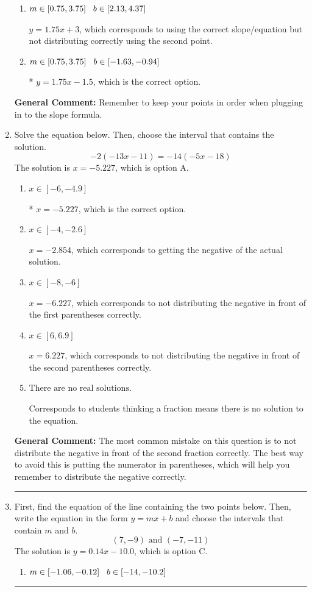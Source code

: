 \documentclass{extbook}[14pt]
\newcommand{\litem}[1]{\item #1

\rule{\textwidth}{0.4pt}}
\begin{document}
\begin{enumerate}
{\begin{enumerate}[label=\Alph*.]
 $y = -1.75x + 19.5$, which corresponds to using the negative slope and the correct equation.
\item \( m \in [0.75, 3.75] \hspace*{3mm} b \in [2.13, 4.37] \)

 $y = 1.75x + 3$, which corresponds to using the correct slope/equation but not distributing correctly using the second point.
\item \( m \in [0.75, 3.75] \hspace*{3mm} b \in [-1.63, -0.94] \)

* $y = 1.75x -1.5$, which is the correct option.
\end{enumerate}

\textbf{General Comment:} Remember to keep your points in order when plugging in to the slope formula.
}
\litem{
Solve the equation below. Then, choose the interval that contains the solution.
\[ -2(-13x -11) = -14(-5x -18) \]The solution is \( x = -5.227 \), which is option A.\begin{enumerate}[label=\Alph*.]
\item \( x \in [-6, -4.9] \)

* $x = -5.227$, which is the correct option.
\item \( x \in [-4, -2.6] \)

$x = -2.854$, which corresponds to getting the negative of the actual solution.
\item \( x \in [-8, -6] \)

$x = -6.227$, which corresponds to not distributing the negative in front of the first parentheses correctly.
\item \( x \in [6, 6.9] \)

$x = 6.227$, which corresponds to not distributing the negative in front of the second parentheses correctly.
\item \( \text{There are no real solutions.} \)

Corresponds to students thinking a fraction means there is no solution to the equation.
\end{enumerate}

\textbf{General Comment:} The most common mistake on this question is to not distribute the negative in front of the second fraction correctly. The best way to avoid this is putting the numerator in parentheses, which will help you remember to distribute the negative correctly.
}
\litem{
First, find the equation of the line containing the two points below. Then, write the equation in the form $ y=mx+b $ and choose the intervals that contain $m$ and $b$.
\[ (7, -9) \text{ and } (-7, -11) \]The solution is \( y = 0.14x -10.0 \), which is option C.\begin{enumerate}[label=\Alph*.]
\item \( m \in [-1.06, -0.12] \hspace*{3mm} b \in [-14, -10.2] \)


\end{enumerate}}
\end{enumerate}
\end{document}
